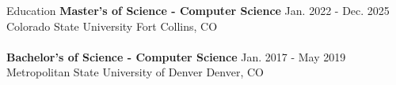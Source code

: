 \documentclass[12pt]{resumeclass}
\begin{document}
\vspace{8pt}
\resumesect
    {Education}
    {\textbf{Master's of Science - Computer Science} \hfill \normalsize{Jan. 2022 - Dec. 2025}\\
    Colorado State University \hfill \normalsize{Fort Collins, CO}\\
    \vspace{-2pt}\\
    \textbf{Bachelor's of Science - Computer Science} \hfill \normalsize{Jan. 2017 - May 2019}\\
    Metropolitan State University of Denver \hfill \normalsize{Denver, CO}}\\
\end{document}
